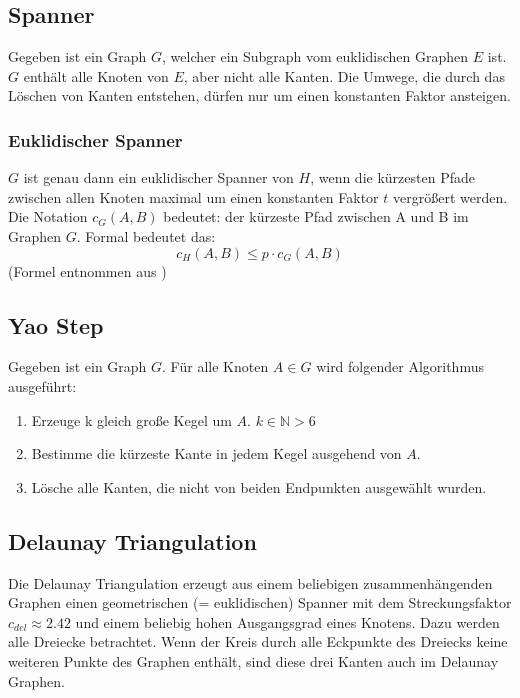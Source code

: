 \documentclass[a4paper,twoside]{IEEEtran}
\begin{document}
\subsection{Spanner}
Gegeben ist ein Graph $G $, welcher ein Subgraph vom euklidischen Graphen $E $ ist. $G $ enthält alle Knoten von $E $, aber nicht alle Kanten. Die Umwege, die durch das Löschen von Kanten entstehen, dürfen nur um einen konstanten Faktor ansteigen. 

\subsubsection{Euklidischer Spanner}
$G $ ist genau dann ein euklidischer Spanner von $H $, wenn die kürzesten Pfade zwischen allen Knoten maximal um einen konstanten Faktor $t $ vergrößert werden.
Die Notation $c_{G}(A, B) $ bedeutet: der kürzeste Pfad zwischen A und B im Graphen $G $.
Formal bedeutet das:
\begin{equation}
	c_H(A, B) \leq p \cdot c_G(A, B)
\end{equation}
{\footnotesize (Formel entnommen aus \cite{kanj})}

\subsection{Yao Step}
Gegeben ist ein Graph $G $. Für alle Knoten $A \in G $ wird folgender Algorithmus ausgeführt:
\begin{enumerate}
\item Erzeuge k gleich große Kegel um $A $. $k \in \mathds{N} > 6 $
\item Bestimme die kürzeste Kante in jedem Kegel ausgehend von $A $.
\item Lösche alle Kanten, die nicht von beiden Endpunkten ausgewählt wurden.

\end{enumerate} 

\subsection{Delaunay Triangulation}
Die Delaunay Triangulation erzeugt aus einem beliebigen zusammenhängenden Graphen einen geometrischen (= euklidischen) Spanner mit dem Streckungsfaktor $c_{del} \approx 2.42 $ und einem beliebig hohen Ausgangsgrad eines Knotens. 
Dazu werden alle Dreiecke betrachtet.
Wenn der Kreis durch alle Eckpunkte des Dreiecks keine weiteren Punkte des Graphen enthält, sind diese drei Kanten auch im Delaunay Graphen. 
\end{document}
